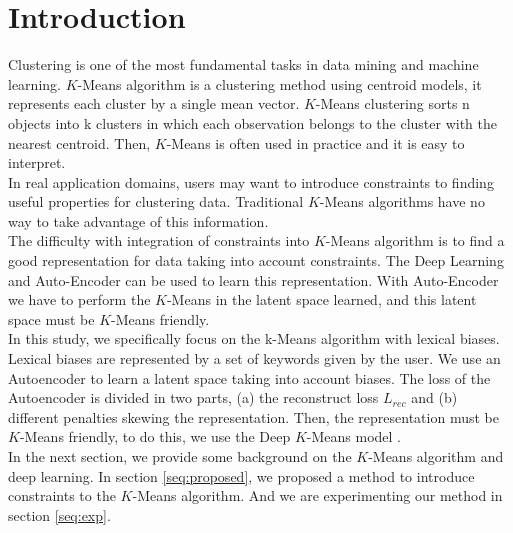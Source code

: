 \section{Introduction}\label{sec:intro}

Clustering is one of the most fundamental tasks in data mining and machine
learning. $K$-Means algorithm is a clustering method using centroid models,
it represents each cluster by a single mean vector. $K$-Means clustering sorts
n objects into k clusters in which each observation belongs to
the cluster with the nearest centroid.
Then, $K$-Means is often used in practice and it is easy to interpret. 
\\In real application domains, users may want to introduce constraints to finding 
useful properties for clustering data. Traditional $K$-Means algorithms 
have no way to take advantage of this information.
\\The difficulty with integration of constraints into $K$-Means
algorithm is to find a good representation for data  taking into
account constraints. The Deep Learning and Auto-Encoder can be used to
learn this representation. With Auto-Encoder we have to perform the
$K$-Means in the latent space learned, and this latent space must be
$K$-Means friendly.
\\In this study, we specifically focus on the k-Means algorithm with lexical biases. Lexical biases are represented
by a set of keywords given by the user. We use an Autoencoder to learn a latent space taking
into account biases. The loss of the Autoencoder is divided in two parts, (a) 
the reconstruct loss $L_{rec}$ and (b) different penalties skewing the
representation. Then, the representation must be $K$-Means friendly, 
to do this, we use the Deep $K$-Means model \cite{Deap-K-Means}.  
\\In the next section, we provide some background on the $K$-Means algorithm and
deep learning. In section \ref{seq:proposed}, we proposed a method to introduce constraints to 
the $K$-Means algorithm. And we are experimenting our method in section \ref{seq:exp}.
